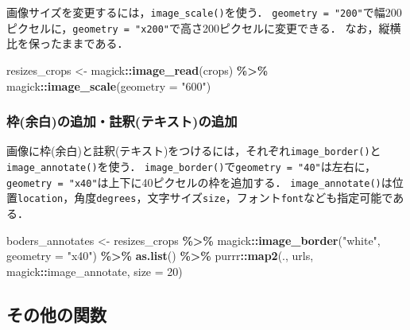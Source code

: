 \documentclass[
]{article}
\newenvironment{Shaded}{\begin{snugshade}}{\end{snugshade}}
\newcommand{\AttributeTok}[1]{\textcolor[rgb]{0.13,0.29,0.53}{#1}}
\newcommand{\DecValTok}[1]{\textcolor[rgb]{0.00,0.00,0.81}{#1}}
\newcommand{\FunctionTok}[1]{\textcolor[rgb]{0.13,0.29,0.53}{\textbf{#1}}}
\newcommand{\NormalTok}[1]{#1}
\newcommand{\OtherTok}[1]{\textcolor[rgb]{0.56,0.35,0.01}{#1}}
\newcommand{\SpecialCharTok}[1]{\textcolor[rgb]{0.81,0.36,0.00}{\textbf{#1}}}
\newcommand{\StringTok}[1]{\textcolor[rgb]{0.31,0.60,0.02}{#1}}
\begin{document}
画像サイズを変更するには，\texttt{image\_scale()}を使う．
\texttt{geometry\ =\ "200"}で幅200ピクセルに，\texttt{geometry\ =\ "x200"}で高さ200ピクセルに変更できる．
なお，縦横比を保ったままである．

\begin{Shaded}
\begin{Highlighting}[]
\NormalTok{resizes\_crops }\OtherTok{\textless{}{-}} 
\NormalTok{  magick}\SpecialCharTok{::}\FunctionTok{image\_read}\NormalTok{(crops) }\SpecialCharTok{\%\textgreater{}\%}
\NormalTok{  magick}\SpecialCharTok{::}\FunctionTok{image\_scale}\NormalTok{(}\AttributeTok{geometry =} \StringTok{"600"}\NormalTok{)}
\end{Highlighting}
\end{Shaded}

\hypertarget{ux67a0ux4f59ux767dux306eux8ffdux52a0ux8a3bux91c8ux30c6ux30adux30b9ux30c8ux306eux8ffdux52a0}{%
\subsubsection{枠(余白)の追加・註釈(テキスト)の追加}\label{ux67a0ux4f59ux767dux306eux8ffdux52a0ux8a3bux91c8ux30c6ux30adux30b9ux30c8ux306eux8ffdux52a0}}

画像に枠(余白)と註釈(テキスト)をつけるには，それぞれ\texttt{image\_border()}と\texttt{image\_annotate()}を使う．
\texttt{image\_border()}で\texttt{geometry\ =\ "40"}は左右に，\texttt{geometry\ =\ "x40"}は上下に40ピクセルの枠を追加する．
\texttt{image\_annotate()}は位置\texttt{location}，角度\texttt{degrees}，文字サイズ\texttt{size}，フォント\texttt{font}なども指定可能である．

\begin{Shaded}
\begin{Highlighting}[]
\NormalTok{boders\_annotates }\OtherTok{\textless{}{-}} 
\NormalTok{  resizes\_crops }\SpecialCharTok{\%\textgreater{}\%}
\NormalTok{  magick}\SpecialCharTok{::}\FunctionTok{image\_border}\NormalTok{(}\StringTok{"white"}\NormalTok{, }\AttributeTok{geometry =} \StringTok{"x40"}\NormalTok{) }\SpecialCharTok{\%\textgreater{}\%}
  \FunctionTok{as.list}\NormalTok{() }\SpecialCharTok{\%\textgreater{}\%}
\NormalTok{  purrr}\SpecialCharTok{::}\FunctionTok{map2}\NormalTok{(., urls, magick}\SpecialCharTok{::}\NormalTok{image\_annotate, }\AttributeTok{size =} \DecValTok{20}\NormalTok{)}
\end{Highlighting}
\end{Shaded}

\hypertarget{ux305dux306eux4ed6ux306eux95a2ux6570}{%
\subsection{その他の関数}\label{ux305dux306eux4ed6ux306eux95a2ux6570}}
\end{document}
